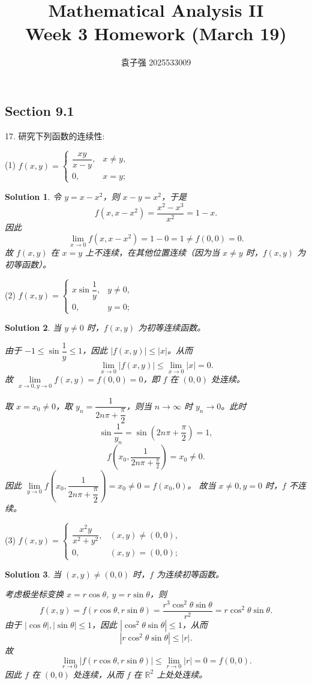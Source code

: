 \documentclass[a4paper,12pt]{article}
\title{Mathematical Analysis II\\Week 3 Homework (March 19)}
\author{袁子强\hspace{1cm} 2025533009}
\newtheorem*{sol}{Solution}
\begin{document}
\maketitle

\subsection*{Section 9.1}

17. 研究下列函数的连续性:

(1) $f(x,y) =
    \begin{cases}
        \dfrac{xy}{x-y}, & x \neq y, \\
        0,               & x = y;
    \end{cases}$
\begin{sol}
    令 $y=x-x^2$，则 $x-y=x^2$，于是
    $$f(x,x-x^2)=\frac{x^2-x^3}{x^2}=1-x.$$
    因此
    $$\lim_{x\to 0}f(x,x-x^2)=1-0=1\neq f(0,0)=0.$$
    故 $f(x,y)$ 在 $x=y$ 上不连续，在其他位置连续（因为当 $x\neq y$ 时，$f(x,y)$ 为初等函数）。
\end{sol}

(2) $f(x,y) =
    \begin{cases}
        x \sin \dfrac{1}{y}, & y \neq 0, \\
        0,                   & y = 0;
    \end{cases}$
\begin{sol}
    当 $y\neq 0$ 时，$f(x,y)$ 为初等连续函数。

    由于 $-1\leq\sin\dfrac{1}{y}\leq 1$，因此 $|f(x,y)|\leq|x|$。从而
    $$\lim_{x\to 0}|f(x,y)|\leq\lim_{x\to 0}|x|=0.$$
    故 $\lim\limits_{x\to 0,y\to 0}f(x,y)=f(0,0)=0$，即 $f$ 在 $(0,0)$ 处连续。

    取 $x=x_0\neq 0$，取 $y_n=\dfrac{1}{2n\pi+\dfrac{\pi}{2}}$，则当 $n\to\infty$ 时 $y_n\to 0$。此时
    $$\sin\frac{1}{y_n}=\sin\left(2n\pi+\frac{\pi}{2}\right)=1,$$
    $$f\left(x_0,\frac{1}{2n\pi+\frac{\pi}{2}}\right)=x_0\neq 0.$$
    因此 $\lim\limits_{y\to 0}f\left(x_0,\dfrac{1}{2n\pi+\dfrac{\pi}{2}}\right)=x_0\neq 0=f(x_0,0)$。
    故当 $x\neq 0,y=0$ 时，$f$ 不连续。
\end{sol}

(3) $f(x,y) =
    \begin{cases}
        \dfrac{x^2 y}{x^2 + y^2}, & (x,y) \neq (0,0), \\
        0,                        & (x,y) = (0,0);
    \end{cases}$
\begin{sol}
    当 $(x,y)\neq(0,0)$ 时，$f$ 为连续初等函数。

    考虑极坐标变换 $x=r\cos\theta$, $y=r\sin\theta$，则
    $$f(x,y)=f(r\cos\theta,r\sin\theta)=\frac{r^3\cos^2\theta\sin\theta}{r^2}=r\cos^2\theta\sin\theta.$$
    由于 $|\cos\theta|,|\sin\theta|\leq 1$，因此 $|\cos^2\theta\sin\theta|\leq 1$，从而
    $$|r\cos^2\theta\sin\theta|\leq|r|.$$
    故
    $$\lim_{r\to 0}|f(r\cos\theta,r\sin\theta)|\leq\lim_{r\to 0}|r|=0=f(0,0).$$
    因此 $f$ 在 $(0,0)$ 处连续，从而 $f$ 在 $\mathbb{R}^2$ 上处处连续。
\end{sol}
\end{document}
